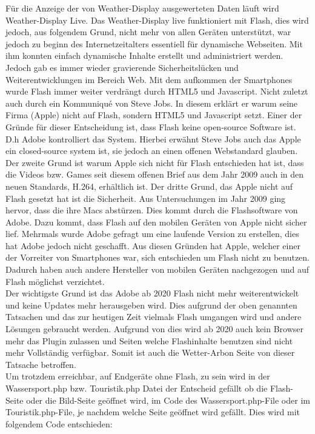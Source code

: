 \documentclass[a4paper,ngerman, 11pt, pagesize]{report}
\begin{document}
Für die Anzeige der von Weather-Display ausgewerteten Daten läuft wird Weather-Display Live. Das Weather-Display live funktioniert mit Flash, dies wird jedoch, aus folgendem Grund, nicht mehr von allen Geräten unterstützt, war jedoch zu beginn des Internetzeitalters essentiell für dynamische Webseiten. Mit ihm konnten einfach dynamische Inhalte erstellt und administriert werden. Jedoch gab es immer wieder gravierende Sicherheitslücken und Weiterentwicklungen im Bereich Web. Mit dem aufkommen der Smartphones wurde Flash immer weiter verdrängt durch HTML5 und Javascript. Nicht zuletzt auch durch ein Kommuniqué von Steve Jobs. In diesem erklärt er warum seine Firma (Apple) nicht auf Flash, sondern HTML5 und Javascript setzt. Einer der Gründe für dieser Entscheidung ist, dass Flash keine open-source Software ist. D.h Adobe kontrolliert das System. Hierbei erwähnt Steve Jobs auch das Apple ein closed-source system ist, sie jedoch an einen offenen Webstandard glauben. Der zweite Grund ist warum Apple sich nicht für Flash entschieden hat ist, dass die Videos bzw. Games seit diesem offenen Brief aus dem Jahr 2009 auch in den neuen Standards, H.264, erhältlich ist. Der dritte Grund, das Apple nicht auf Flash gesetzt hat ist die Sicherheit. Aus Untersuchungen im Jahr 2009 ging hervor, dass die ihre Macs abstürzen. Dies kommt durch die Flashsoftware von Adobe. Dazu kommt, dass Flash auf den mobilen Geräten von Apple nicht sicher lief. Mehrmals wurde Adobe gefragt um eine laufende Version zu erstellen, dies hat Adobe jedoch nicht geschafft. Aus diesen Gründen hat Apple, welcher einer der Vorreiter von Smartphones war, sich entschieden um Flash nicht zu benutzen. Dadurch haben auch andere Hersteller von mobilen Geräten nachgezogen und auf Flash möglichst verzichtet. \cite{Apple:ThoughtsOnFlash} \\
Der wichtigste Grund ist das Adobe ab 2020 Flash nicht mehr weiterentwickelt und keine Updates mehr herausgeben wird. Dies aufgrund der oben genannten Tatsachen und das zur heutigen Zeit vielmals Flash umgangen wird und andere Lösungen gebraucht werden. Aufgrund von dies wird ab 2020 auch kein Browser mehr das Plugin zulassen und Seiten welche Flashinhalte benutzen sind nicht mehr Vollständig verfügbar. Somit ist auch die Wetter-Arbon Seite von dieser Tatsache betroffen. \cite{Adobe:FlashTheFutureofInteractiveContent}\\
Um trotzdem erreichbar, auf Endgeräte ohne Flash, zu sein wird in der Wassersport.php bzw. Touristik.php Datei der Entscheid gefällt ob die Flash-Seite oder die Bild-Seite geöffnet wird, im Code des Wassersport.php-File oder im Touristik.php-File, je nachdem welche Seite geöffnet wird gefällt. Dies wird mit folgendem Code entschieden: 
\end{document}

